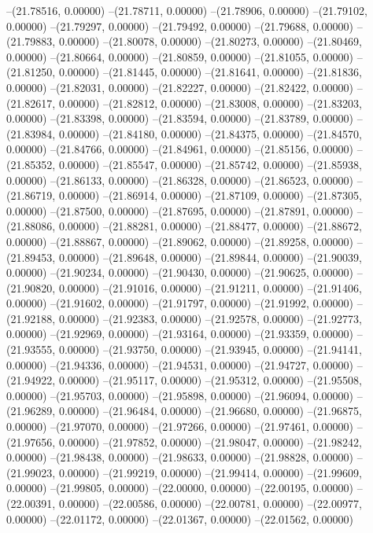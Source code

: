 --(21.78516, 0.00000)
--(21.78711, 0.00000)
--(21.78906, 0.00000)
--(21.79102, 0.00000)
--(21.79297, 0.00000)
--(21.79492, 0.00000)
--(21.79688, 0.00000)
--(21.79883, 0.00000)
--(21.80078, 0.00000)
--(21.80273, 0.00000)
--(21.80469, 0.00000)
--(21.80664, 0.00000)
--(21.80859, 0.00000)
--(21.81055, 0.00000)
--(21.81250, 0.00000)
--(21.81445, 0.00000)
--(21.81641, 0.00000)
--(21.81836, 0.00000)
--(21.82031, 0.00000)
--(21.82227, 0.00000)
--(21.82422, 0.00000)
--(21.82617, 0.00000)
--(21.82812, 0.00000)
--(21.83008, 0.00000)
--(21.83203, 0.00000)
--(21.83398, 0.00000)
--(21.83594, 0.00000)
--(21.83789, 0.00000)
--(21.83984, 0.00000)
--(21.84180, 0.00000)
--(21.84375, 0.00000)
--(21.84570, 0.00000)
--(21.84766, 0.00000)
--(21.84961, 0.00000)
--(21.85156, 0.00000)
--(21.85352, 0.00000)
--(21.85547, 0.00000)
--(21.85742, 0.00000)
--(21.85938, 0.00000)
--(21.86133, 0.00000)
--(21.86328, 0.00000)
--(21.86523, 0.00000)
--(21.86719, 0.00000)
--(21.86914, 0.00000)
--(21.87109, 0.00000)
--(21.87305, 0.00000)
--(21.87500, 0.00000)
--(21.87695, 0.00000)
--(21.87891, 0.00000)
--(21.88086, 0.00000)
--(21.88281, 0.00000)
--(21.88477, 0.00000)
--(21.88672, 0.00000)
--(21.88867, 0.00000)
--(21.89062, 0.00000)
--(21.89258, 0.00000)
--(21.89453, 0.00000)
--(21.89648, 0.00000)
--(21.89844, 0.00000)
--(21.90039, 0.00000)
--(21.90234, 0.00000)
--(21.90430, 0.00000)
--(21.90625, 0.00000)
--(21.90820, 0.00000)
--(21.91016, 0.00000)
--(21.91211, 0.00000)
--(21.91406, 0.00000)
--(21.91602, 0.00000)
--(21.91797, 0.00000)
--(21.91992, 0.00000)
--(21.92188, 0.00000)
--(21.92383, 0.00000)
--(21.92578, 0.00000)
--(21.92773, 0.00000)
--(21.92969, 0.00000)
--(21.93164, 0.00000)
--(21.93359, 0.00000)
--(21.93555, 0.00000)
--(21.93750, 0.00000)
--(21.93945, 0.00000)
--(21.94141, 0.00000)
--(21.94336, 0.00000)
--(21.94531, 0.00000)
--(21.94727, 0.00000)
--(21.94922, 0.00000)
--(21.95117, 0.00000)
--(21.95312, 0.00000)
--(21.95508, 0.00000)
--(21.95703, 0.00000)
--(21.95898, 0.00000)
--(21.96094, 0.00000)
--(21.96289, 0.00000)
--(21.96484, 0.00000)
--(21.96680, 0.00000)
--(21.96875, 0.00000)
--(21.97070, 0.00000)
--(21.97266, 0.00000)
--(21.97461, 0.00000)
--(21.97656, 0.00000)
--(21.97852, 0.00000)
--(21.98047, 0.00000)
--(21.98242, 0.00000)
--(21.98438, 0.00000)
--(21.98633, 0.00000)
--(21.98828, 0.00000)
--(21.99023, 0.00000)
--(21.99219, 0.00000)
--(21.99414, 0.00000)
--(21.99609, 0.00000)
--(21.99805, 0.00000)
--(22.00000, 0.00000)
--(22.00195, 0.00000)
--(22.00391, 0.00000)
--(22.00586, 0.00000)
--(22.00781, 0.00000)
--(22.00977, 0.00000)
--(22.01172, 0.00000)
--(22.01367, 0.00000)
--(22.01562, 0.00000)

